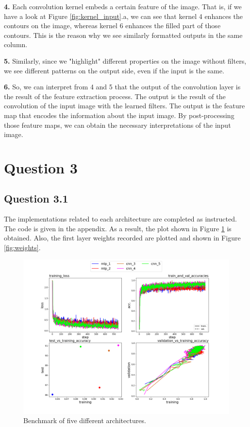 \documentclass{assignment}
\begin{document}
\textbf{4.}
\noindent Each convolution kernel embeds a certain feature of the image. That is, if we have a look at Figure \ref{fig:kernel_input}.a, we can see that kernel 4 enhances the contours on the image, whereas kernel 6 enhances the filled part of those contours. This is the reason why we see similarly formatted outputs in the same column.

\textbf{5.}
\noindent Similarly, since we "highlight" different properties on the image without filters, we see different patterns on the output side, even if the input is the same.

\textbf{6.}
So, we can interpret from 4 and 5 that the output of the convolution layer is the result of the feature extraction process. The output is the result of the convolution of the input image with the learned filters. The output is the feature map that encodes the information about the input image. By post-processing those feature maps, we can obtain the necessary interpretations of the input image.

\section{Question 3}
\subsection*{Question 3.1}
The implementations related to each architecture are completed as instructed. The code is given in the appendix. As a result, the plot shown in Figure \ref{Q3} is obtained. Also, the first layer weights recorded are plotted and shown in Figure \ref{fig:weights}.

\begin{figure}[!htb]
    \centering
    \includegraphics[width=1\textwidth]{figures/q3_results.png}
    \caption{Benchmark of five different architectures.}
    \label{Q3}
\end{figure}
\end{document}
